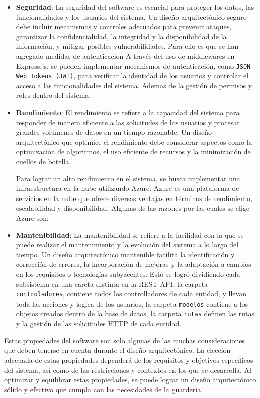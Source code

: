 \begin{itemize}
\item \textbf{Seguridad}: La seguridad del software es esencial para proteger los datos, las funcionalidades y los usuarios del sistema. Un diseño arquitectónico seguro debe incluir mecanismos y controles adecuados para prevenir ataques, garantizar la confidencialidad, la integridad y la disponibilidad de la información, y mitigar posibles vulnerabilidades. Para ello es que se han agregado medidas de autenticacion A través del uso de middlewares en Express.js, se pueden implementar mecanismos de autenticación, como \texttt{JSON Web Tokens (JWT)}, para verificar la identidad de los usuarios y controlar el acceso a las funcionalidades del sistema.
Ademas de la gestión de permisos y roles dentro del sistema.

\item \textbf{Rendimiento}: El rendimiento se refiere a la capacidad del sistema para responder de manera eficiente a las solicitudes de los usuarios y procesar grandes volúmenes de datos en un tiempo razonable. Un diseño arquitectónico que optimice el rendimiento debe considerar aspectos como la optimización de algoritmos, el uso eficiente de recursos y la minimización de cuellos de botella.

Para lograr un alto rendimiento en el sistema, se busca implementar una infraestructura en la nube utilizando Azure. Azure es una plataforma de servicios en la nube que ofrece diversas ventajas en términos de rendimiento, escalabilidad y disponibilidad. Algunas de las razones por las cuales se elige Azure son:

\item \textbf{Mantenibilidad}: La mantenibilidad se refiere a la facilidad con la que se puede realizar el mantenimiento y la evolución del sistema a lo largo del tiempo. Un diseño arquitectónico mantenible facilita la identificación y corrección de errores, la incorporación de mejoras y la adaptación a cambios en los requisitos o tecnologías subyacentes. Esto se logró dividiendo cada subsistema en una careta distinta en la REST API, la carpeta \texttt{controladores}, contiene todos los controlladores de cada entidad, y llevan toda las acciones y logica de los usuarios, la carpeta \texttt{modelos} contiene a los objetos creados dentro de la base de datos, la carpeta \texttt{rutas} definen las rutas y la gestión de las solicitudes HTTP de cada entidad.
\end{itemize}

Estas propiedades del software son solo algunas de las muchas consideraciones que deben tenerse en cuenta durante el diseño arquitectónico. La elección adecuada de estas propiedades dependerá de los requisitos y objetivos específicos del sistema, así como de las restricciones y contextos en los que se desarrolla. Al optimizar y equilibrar estas propiedades, se puede lograr un diseño arquitectónico sólido y efectivo que cumpla con las necesidades de la guarderia.


